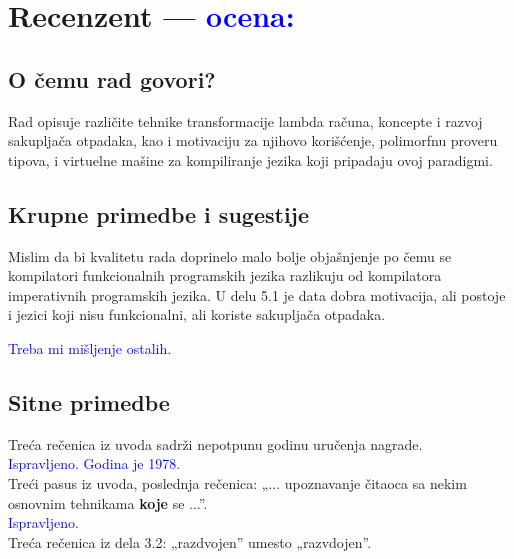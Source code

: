 \documentclass[a4paper]{report}
\newcommand{\odgovor}[1]{\textcolor{blue}{#1}}
\begin{document}
\chapter{Recenzent \odgovor{--- ocena:} }


\section{O čemu rad govori?}
Rad opisuje različite tehnike transformacije lambda računa, koncepte i razvoj sakupljača otpadaka, kao i motivaciju za njihovo korišćenje, polimorfnu proveru tipova, i virtuelne mašine za kompiliranje jezika koji pripadaju ovoj paradigmi.

\section{Krupne primedbe i sugestije}
Mislim da bi kvalitetu rada doprinelo malo bolje objašnjenje po čemu se kompilatori funkcionalnih programskih jezika razlikuju od kompilatora imperativnih programskih jezika. U delu 5.1 je data dobra motivacija, ali postoje i jezici koji nisu funkcionalni, ali koriste sakupljača otpadaka.

\odgovor{Treba mi mišljenje ostalih.}

\section{Sitne primedbe}
Treća rečenica iz uvoda sadrži nepotpunu godinu uručenja nagrade.\\

\odgovor{Ispravljeno. Godina je 1978.}\\

Treći pasus iz uvoda, poslednja rečenica: „... upoznavanje čitaoca sa nekim osnovnim tehnikama \textbf{koje} se ...”.\\

\odgovor{Ispravljeno.}\\

Treća rečenica iz dela 3.2: „razdvojen” umesto „razvdojen”.\\
\end{document}
